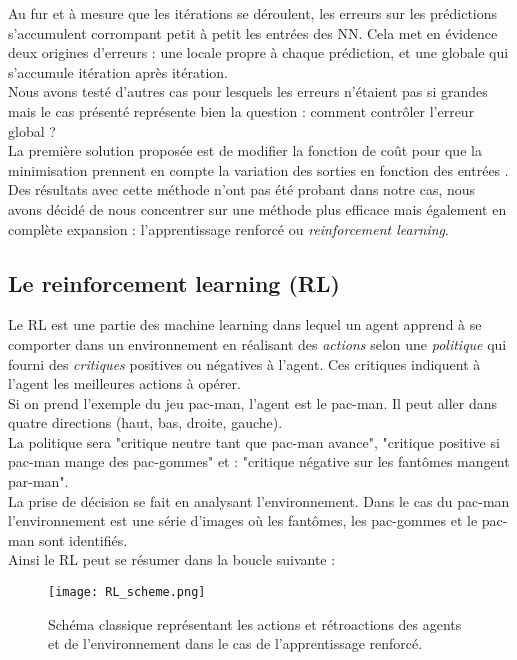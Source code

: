 \documentclass[a4paper,12pt]{article}
\newcommand\bk{\color{black}}
\newcommand\brick{\color{brick}}
\numberwithin{equation}{section} %
\begin{document}
\noindent Au fur et à mesure que les itérations se déroulent, les erreurs sur les prédictions s'accumulent corrompant petit à petit les entrées des NN. Cela met en évidence deux origines d'erreurs : une locale propre à chaque prédiction, et une globale qui s'accumule itération après itération.\\
Nous avons testé d'autres cas pour lesquels les erreurs n'étaient pas si grandes mais le cas présenté représente bien la question : comment contrôler l'erreur global ?\\
La première solution proposée est de modifier la fonction de coût pour que la minimisation prennent en compte la variation des sorties en fonction des entrées \citep{pan2018long}. Des résultats avec cette méthode n'ont pas été probant dans notre cas, nous avons décidé de nous concentrer sur une méthode plus efficace mais également en complète expansion : l'apprentissage renforcé ou \textit{reinforcement learning}.

\brick \subsection{Le reinforcement learning (RL)} \bk \label{sec_REIL}
\noindent Le RL est une partie des machine learning dans lequel un agent apprend à se comporter dans un environnement en réalisant des \textit{actions} selon une \textit{politique} qui fourni des \textit{critiques} positives ou négatives à l'agent. Ces critiques indiquent à l'agent les meilleures actions à opérer.\\
Si on prend l'exemple du jeu pac-man, l'agent est le pac-man. Il peut aller dans quatre directions (haut, bas, droite, gauche). \\
La politique sera "critique neutre  tant que pac-man avance", "critique positive si pac-man mange des pac-gommes" et : "critique négative sur les fantômes mangent par-man".\\
La prise de décision se fait en analysant l'environnement. Dans le cas du pac-man l'environnement est une série d'images où les fantômes, les pac-gommes et le pac-man sont identifiés.\\
 Ainsi le RL peut se résumer dans la boucle suivante : 
\begin{figure}[!ht]
 \centering
 \texttt{[image: RL\_scheme.png]}
 \caption{\small{Schéma classique représentant les actions et rétroactions des agents et de l'environnement dans le cas de l'apprentissage renforcé.}}
 \label{boucleRL}
 \end{figure} 
 
\end{document}
